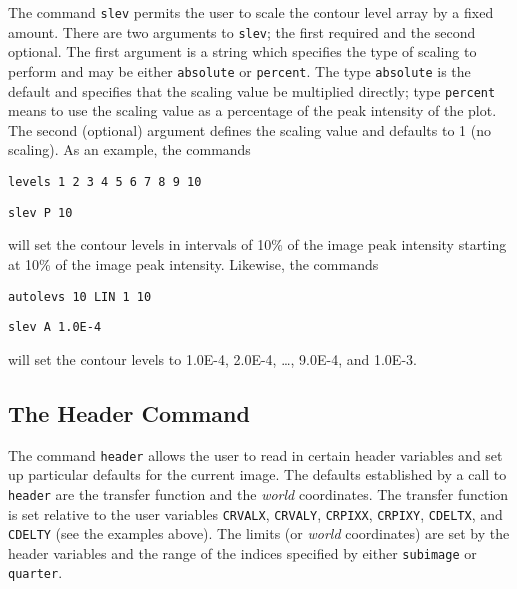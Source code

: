 The command
{\tt slev}%
%
permits the user to scale the contour level array by a fixed amount.
There are two arguments to {\tt slev};
the first required and the second optional.
The first argument is a string which specifies the type of scaling
to perform and may be either {\tt absolute} or {\tt percent}.
The type {\tt absolute} is the default and specifies that the
scaling value be multiplied directly;
type {\tt percent} means to use the scaling value as a percentage
of the peak intensity of the plot.
The second (optional) argument defines the scaling value and defaults to 1
(no scaling).
As an example, the commands
\begin{wiplist}%
  \item {\tt levels 1 2 3 4 5 6 7 8 9 10}
\samepage
  \item {\tt slev P 10}
\end{wiplist}
will set the contour levels in intervals of 10\%
of the image peak intensity starting
at 10\% of the image peak intensity.
Likewise, the commands
\begin{wiplist}%
  \item {\tt autolevs 10 LIN 1 10}
\samepage
  \item {\tt slev A 1.0E-4}
\end{wiplist}
will set the contour levels to 1.0E-4, 2.0E-4, \ldots, 9.0E-4, and 1.0E-3.

\subsection*		{The Header Command}

The command
{\tt header}%
allows the user to read in certain header variables and set up
particular defaults for the current image.
The defaults established by a call to {\tt header}
are the transfer function
and the {\em world} coordinates.
The transfer function is set relative to
the user variables
{\tt CRVALX}, {\tt CRVALY}, {\tt CRPIXX}, {\tt CRPIXY}, {\tt CDELTX},
and {\tt CDELTY} (see the examples above).
The limits (or {\em world} coordinates) are set by the header variables and the
range of the indices specified by either
{\tt subimage}
or
{\tt quarter}.

